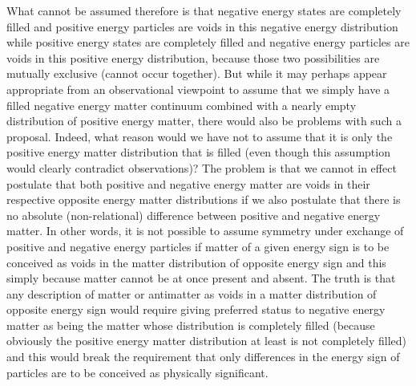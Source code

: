 \documentclass[notitlepage,12pt]{report}
\begin{document}
What cannot be assumed therefore is that negative energy states are completely filled and positive energy particles are voids in this negative energy distribution while positive energy states are completely filled and negative energy particles are voids in this positive energy distribution, because those two possibilities are mutually exclusive (cannot occur together). But while it may perhaps appear appropriate from an observational viewpoint to assume that we simply have a filled negative energy matter continuum combined with a nearly empty distribution of positive energy matter, there would also be problems with such a proposal. Indeed, what reason would we have not to assume that it is only the positive energy matter distribution that is filled (even though this assumption would clearly contradict observations)? The problem is that we cannot in effect postulate that both positive and negative energy matter are voids in their respective opposite energy matter distributions if we also postulate that there is no absolute (non-relational) difference between positive and negative energy matter. In other words, it is not possible to assume symmetry under exchange of positive and negative energy particles if matter of a given energy sign is to be conceived as voids in the matter distribution of opposite energy sign and this simply because matter cannot be at once present and absent. The truth is that any description of matter or antimatter as voids in a matter distribution of opposite energy sign would require giving preferred status to negative energy matter as being the matter whose distribution is completely filled (because obviously the positive energy matter distribution at least is not completely filled) and this would break the requirement that only differences in the energy sign of particles are to be conceived as physically significant.
\end{document}
